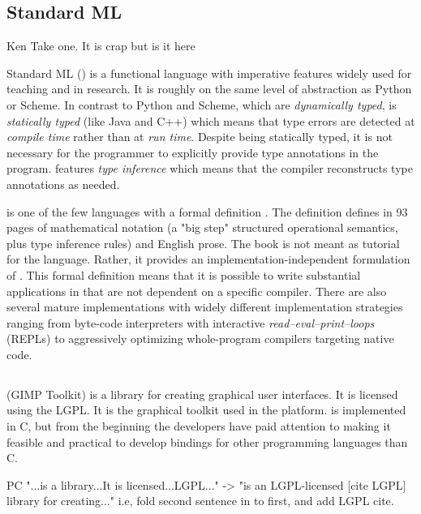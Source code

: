 \documentclass[workingdraft]{usetex-v1}
\begin{document}
\subsection{Standard ML}

\begin{ednote}{Ken}
  Take one.  It is crap but is it here
\end{ednote}

Standard ML (\sml) is a functional language with imperative features
widely used for teaching and in research.  It is roughly on the same
level of abstraction as Python or Scheme. In contrast to Python and
Scheme, which are \emph{dynamically typed}, \sml is \emph{statically
  typed} (like Java and C++) which means that type errors are detected
at \emph{compile time} rather than at \emph{run time}.  Despite \sml
being statically typed, it is not necessary for the programmer to
explicitly provide type annotations in the program. \sml features
\emph{type inference} which means that the compiler reconstructs type
annotations as needed.

\sml is one of the few languages with a formal definition
\cite{Milner:1997:Definition}.  The definition defines \sml in 93
pages of mathematical notation (a "big step" structured operational
semantics, plus type inference rules) and English prose.  The book is
not meant as tutorial for the language. Rather, it provides an
implementation-independent formulation of \sml.  This formal
definition means that it is possible to write substantial applications
in \sml that are not dependent on a specific compiler.  There are also
several mature \sml implementations with widely different
implementation strategies ranging from byte-code interpreters with
interactive \emph{read--eval--print--loops} (REPLs) to aggressively
optimizing whole-program compilers targeting native code.




\subsection{\gtk}
\label{sec:gtk}

\gtk (GIMP Toolkit) is a library for creating graphical user
interfaces. It is licensed using the LGPL. It is the graphical toolkit
used in the \gnome platform.  \gtk is implemented in C, but from the
beginning the \gtk developers have paid attention to making it feasible
and practical to develop bindings for other programming languages than C.

\begin{ednote}{PC}
  "...is a library...It is licensed...LGPL..." -> "is an
  LGPL-licensed [cite LGPL] library for creating..."  i.e, fold
  second sentence in to first, and add LGPL cite.
\end{ednote}
\end{document}
